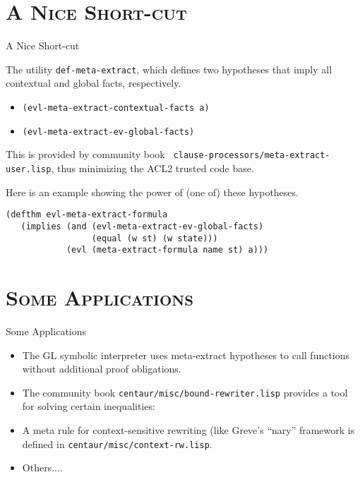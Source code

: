 \section{\scshape A Nice Short-cut}
\begin{frame}[fragile] {A Nice Short-cut}

The utility {\tt def-meta-extract}, which defines two
hypotheses that imply all contextual and global facts, respectively.

\begin{itemize}

\item {\tt (evl-meta-extract-contextual-facts a)}

\item {\tt (evl-meta-extract-ev-global-facts)}

\end{itemize}

This is provided by community book {\tt
  clause-processors/meta-extract-user.lisp}, thus minimizing the ACL2
trusted code base.

Here is an example showing the power of (one of) these hypotheses.

\begin{verbatim}
(defthm evl-meta-extract-formula
   (implies (and (evl-meta-extract-ev-global-facts)
                 (equal (w st) (w state)))
            (evl (meta-extract-formula name st) a)))
\end{verbatim}

\end{frame}
\section{\scshape Some Applications}
\begin{frame}[fragile] {Some Applications}

\begin{itemize}

\item The GL symbolic interpreter uses meta-extract hypotheses to
  call functions without additional proof obligations.

\item The community book {\tt centaur/misc/bound-rewriter.lisp}
  provides a tool for solving certain inequalities:

\item A meta rule for context-sensitive rewriting (like Greve's
  ``nary'' framework is defined in {\tt centaur/misc/context-rw.lisp}.

\item Others....

\end{itemize}

\end{frame}
